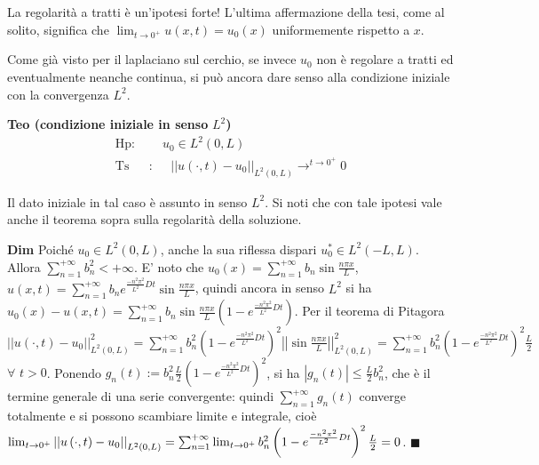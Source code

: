 \documentclass{article}
\begin{document}
La regolarit\`{a} a tratti \`{e} un'ipotesi forte! L'ultima affermazione
della tesi, come al solito, significa che $\lim_{t\rightarrow 0^{+}}u\left(
x,t\right) =u_{0}\left( x\right) $ uniformemente rispetto a $x$.


Come gi\`{a} visto per il laplaciano sul cerchio, se invece $u_{0}$ non \`{e}
regolare a tratti ed eventualmente neanche continua, si pu\`{o} ancora dare
senso alla condizione iniziale con la convergenza $L^{2}$.

\textbf{Teo (condizione iniziale in senso }$L^{2}$\textbf{)}%
\begin{eqnarray*}
\text{Hp}\text{: } &&u_{0}\in L^{2}\left( 0,L\right) \\
\text{Ts} &\text{:}&\text{ }\left\vert \left\vert u\left( \cdot ,t\right)
-u_{0}\right\vert \right\vert _{L^{2}\left( 0,L\right) }\rightarrow
^{t\rightarrow 0^{+}}0
\end{eqnarray*}

Il dato iniziale in tal caso \`{e} assunto in senso $L^{2}$. Si noti che con
tale ipotesi vale anche il teorema sopra sulla regolarit\`{a} della
soluzione.

\textbf{Dim} Poich\'{e} $u_{0}\in L^{2}\left( 0,L\right) $, anche la sua
riflessa dispari $u_{0}^{\ast }\in L^{2}\left( -L,L\right) $. Allora $%
\sum_{n=1}^{+\infty }b_{n}^{2}<+\infty $. E' noto che $u_{0}\left( x\right)
=\sum_{n=1}^{+\infty }b_{n}\sin \frac{n\pi x}{L}$, $u\left( x,t\right)
=\sum_{n=1}^{+\infty }b_{n}e^{\frac{-n^{2}\pi ^{2}}{L^{2}}Dt}\sin \frac{n\pi
x}{L}$, quindi ancora in senso $L^{2}$ si ha $%
u_{0}\left( x\right) -u\left( x,t\right) =\sum_{n=1}^{+\infty }b_{n}\sin 
\frac{n\pi x}{L}\left( 1-e^{\frac{-n^{2}\pi ^{2}}{L^{2}}Dt}\right) $. Per il
teorema di Pitagora $\left\vert \left\vert u\left( \cdot ,t\right)
-u_{0}\right\vert \right\vert _{L^{2}\left( 0,L\right)
}^{2}=\sum_{n=1}^{+\infty }b_{n}^{2}\left( 1-e^{\frac{-n^{2}\pi ^{2}}{L^{2}}%
Dt}\right) ^{2}\left\vert \left\vert \sin \frac{n\pi x}{L}\right\vert
\right\vert _{L^{2}\left( 0,L\right) }^{2}=\sum_{n=1}^{+\infty
}b_{n}^{2}\left( 1-e^{\frac{-n^{2}\pi ^{2}}{L^{2}}Dt}\right) ^{2}\frac{L}{2}$
$\forall $ $t>0$. Ponendo $g_{n}\left( t\right) :=b_{n}^{2}\frac{L}{2}\left(
1-e^{\frac{-n^{2}\pi ^{2}}{L^{2}}Dt}\right) ^{2}$, si ha $\left\vert
g_{n}\left( t\right) \right\vert \leq \frac{L}{2}b_{n}^{2}$, che \`{e} il
termine generale di una serie convergente: quindi $\sum_{n=1}^{+\infty
}g_{n}\left( t\right) $ converge totalmente e si possono scambiare limite e
integrale, cio\`{e} $\lim_{t\rightarrow 0^{+}}\left\vert \left\vert u\left(
\cdot ,t\right) -u_{0}\right\vert \right\vert _{L^{2}\left( 0,L\right)
}=\sum_{n=1}^{+\infty }\lim_{t\rightarrow 0^{+}}b_{n}^{2}\left( 1-e^{\frac{%
-n^{2}\pi ^{2}}{L^{2}}Dt}\right) ^{2}\frac{L}{2}=0$. $\blacksquare $
\end{document}
